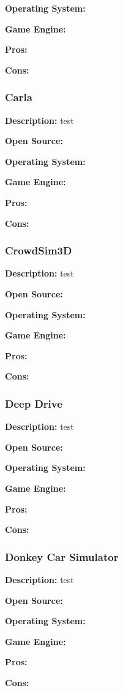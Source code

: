 \textbf{Operating System:}

\textbf{Game Engine:}

\textbf{Pros:}

\textbf{Cons:}


\subsubsection{Carla}
\textbf{Description:} test

\textbf{Open Source:}

\textbf{Operating System:}

\textbf{Game Engine:}

\textbf{Pros:}

\textbf{Cons:}


\subsubsection{CrowdSim3D}
\textbf{Description:} test

\textbf{Open Source:}

\textbf{Operating System:}

\textbf{Game Engine:}

\textbf{Pros:}

\textbf{Cons:}

\subsubsection{Deep Drive}
\textbf{Description:} test

\textbf{Open Source:}

\textbf{Operating System:}

\textbf{Game Engine:}

\textbf{Pros:}

\textbf{Cons:}


\subsubsection{Donkey Car Simulator}
\textbf{Description:} test

\textbf{Open Source:}

\textbf{Operating System:}

\textbf{Game Engine:}

\textbf{Pros:}

\textbf{Cons:}



